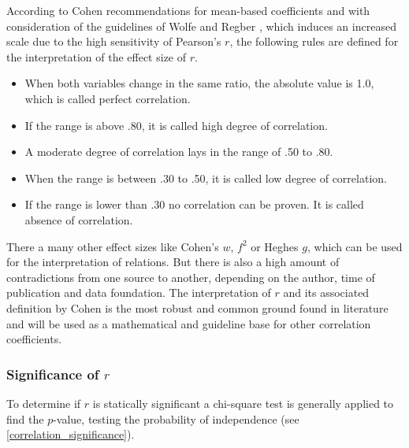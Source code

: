 

According to Cohen recommendations for mean-based coefficients \parencite{Cohen1988,Piegorsch2002,Walker2005} and with consideration of the guidelines of Wolfe \parencite{Wolfe2017} and Regber \parencite{Regber2016}, which induces an increased scale due to the high sensitivity of Pearson's $r$, the following rules are defined for the interpretation of the effect size of $r$.

\begin{itemize}
  \item When both variables change in the same ratio, the absolute value is 1.0, which is called perfect correlation.
  \item If the range is above .80, it is called high degree of correlation.
  \item A moderate degree of correlation lays in the range of .50 to .80.
  \item When the range is between .30 to .50, it is called low degree of correlation.
  \item If the range is lower than .30 no correlation can be proven. It is called absence of correlation.
\end{itemize}	

There a many other effect sizes like Cohen's $w$, $f^2$ or Heghes $g$, which can be used for the interpretation of relations. But there is also a high amount of contradictions from one source to another, depending on the author, time of publication and data foundation. The interpretation of $r$ and its associated definition by Cohen is the most robust and common ground found in literature and will be used as a mathematical and guideline base for other correlation coefficients.

\subsubsection{Significance of $r$}
To determine if $r$ is statically significant a chi-square test is generally applied to find the $p$-value, testing the probability of independence (see \cref{correlation_significance}). 

